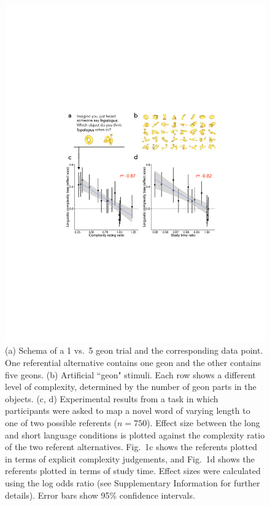 \documentclass[12pt]{article}
\begin{document}
\begin{figure}[t!]
\begin{center}
\includegraphics{figs/FIG_1.pdf}
\caption{(a) Schema of a 1 vs.\ 5 geon trial and the corresponding data point. One referential alternative contains one geon and the other contains five geons. (b) Artificial ``geon" stimuli. Each row shows a different level of complexity, determined by the number of geon parts in the objects. (c, d) Experimental results from a task in which participants were asked to map a novel word of varying length to one of two possible referents ($n=750$). Effect size between the long and short language conditions is plotted against the complexity ratio of the two referent alternatives. Fig.\ 1c shows the referents plotted in terms of explicit complexity judgements, and Fig.\ 1d shows the referents plotted in terms of study time. Effect sizes were calculated using the log odds ratio (see Supplementary Information for further details). Error bars show 95\% confidence intervals.}
\end{center}
\label{fig:geons}
\end{figure}
\end{document}
